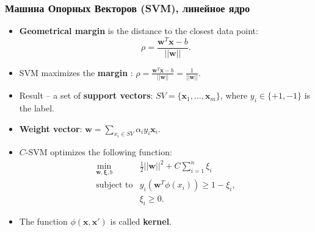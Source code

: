 \begin{frame}
\frametitle{Машина Опорных Векторов (SVM), линейное ядро} 

\begin{itemize}

\item \textbf{Geometrical margin} is the distance to the closest data point: 
$$
\rho = \frac{\mathbf{w}^T\mathbf{x} - b}{||\mathbf{w}||}.
$$


\item SVM maximizes the \textbf{margin} : $
\rho = \frac{\mathbf{w}^T\mathbf{x} - b}{||\mathbf{w}||} =  \frac{1}{||\mathbf{w}||}.
$

  
\item  Result -- a set of \textbf{support vectors}: $SV = \{\mathbf{x}_1,\ldots,\mathbf{x}_m\}$, where $y_i \in \{+1,-1\}$ is the label.



\item \textbf{Weight vector}: 
$ \mathbf{w} = \sum_{x_i \in SV} \alpha_i y_i \mathbf{x}_i.  $


\item $C$-SVM optimizes the following function:
\begin{eqnarray}
\min_{\mathbf{w}, \mathbf{\xi}, b} & \frac{1}{2} ||\mathbf{w}||^2 + C \sum_{i=1}^n \xi_i \\
\text{subject to} & y_i(\mathbf{w}^T\phi(x_i)) \geq 1 - \xi_i, \nonumber \\ 
& \xi_i \geq 0. \nonumber  
\end{eqnarray}


\item The function $\phi(\mathbf{x},\mathbf{x}')$ is called \textbf{kernel}.


\end{itemize}
\end{frame}







